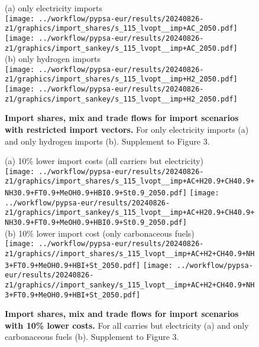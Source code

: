 \begin{figure*}
    \centering
    (a) only electricity imports \\
    \texttt{[image: ../workflow/pypsa-eur/results/20240826-z1/graphics/import\_shares/s\_115\_lvopt\_\_imp+AC\_2050.pdf]}
    \texttt{[image: ../workflow/pypsa-eur/results/20240826-z1/graphics/import\_sankey/s\_115\_lvopt\_\_imp+AC\_2050.pdf]} \\

    (b) only hydrogen imports \\
    \texttt{[image: ../workflow/pypsa-eur/results/20240826-z1/graphics/import\_shares/s\_115\_lvopt\_\_imp+H2\_2050.pdf]}
    \texttt{[image: ../workflow/pypsa-eur/results/20240826-z1/graphics/import\_sankey/s\_115\_lvopt\_\_imp+H2\_2050.pdf]} \\
    \caption{\textbf{Import shares, mix and trade flows for import scenarios with restricted
    import vectors.} For only electricity imports (a) and only hydrogen imports
    (b). Supplement to Figure 3.}
    \label{fig:si:import-shares-a}
\end{figure*}

\begin{figure*}
    \centering
    (a) 10\% lower import costs (all carriers but electricity) \\
    \texttt{[image: ../workflow/pypsa-eur/results/20240826-z1/graphics/import\_shares/s\_115\_lvopt\_\_imp+AC+H20.9+CH40.9+NH30.9+FT0.9+MeOH0.9+HBI0.9+St0.9\_2050.pdf]}
    \texttt{[image: ../workflow/pypsa-eur/results/20240826-z1/graphics/import\_sankey/s\_115\_lvopt\_\_imp+AC+H20.9+CH40.9+NH30.9+FT0.9+MeOH0.9+HBI0.9+St0.9\_2050.pdf]} \\

    (b) 10\% lower import cost (only carbonaceous fuels) \\
    \texttt{[image: ../workflow/pypsa-eur/results/20240826-z1/graphics//import\_shares/s\_115\_lvopt\_\_imp+AC+H2+CH40.9+NH3+FT0.9+MeOH0.9+HBI+St\_2050.pdf]}
    \texttt{[image: ../workflow/pypsa-eur/results/20240826-z1/graphics//import\_sankey/s\_115\_lvopt\_\_imp+AC+H2+CH40.9+NH3+FT0.9+MeOH0.9+HBI+St\_2050.pdf]} \\
    \caption{\textbf{Import shares, mix and trade flows for import scenarios with 10\% lower
    costs.} For all carries but electricity (a) and only carbonaceous fuels (b).
    Supplement to Figure 3.}
    \label{fig:si:import-shares-b}
\end{figure*}

